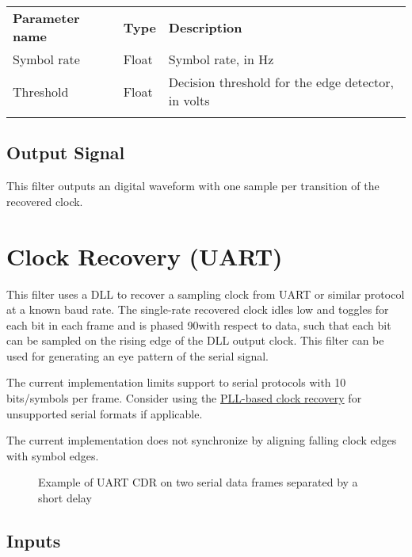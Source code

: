 \begin{tabularx}{16cm}{llX}
\thickhline
\textbf{Parameter name} & \textbf{Type} & \textbf{Description} \\
\thickhline
Symbol rate & Float & Symbol rate, in Hz\\
\thinhline
Threshold & Float & Decision threshold for the edge detector, in volts\\
\thickhline
\end{tabularx}

\subsection{Output Signal}

This filter outputs an digital waveform with one sample per transition of the recovered clock.

\pagebreak
\section{Clock Recovery (UART)}
\label{filter:cdruart}

This filter uses a DLL to recover a sampling clock from UART or similar protocol at a known baud rate. The single-rate
recovered clock idles low and toggles for each bit in each frame and is phased 90\textdegree with respect to data, such
that each bit can be sampled on the rising edge of the DLL output clock. This filter can be used for generating an eye
pattern of the serial signal.

The current implementation limits support to serial protocols with 10 bits/symbols per frame. Consider using the
\hyperref[filter:cdrpll]{PLL-based clock recovery} for unsupported serial formats if applicable.

The current implementation does not synchronize by aligning falling clock edges with symbol edges.

\begin{figure}[h]
\centering
{}
\caption{Example of UART CDR on two serial data frames separated by a short delay}
\label{filter_cdruart}
\end{figure}

\subsection{Inputs}

